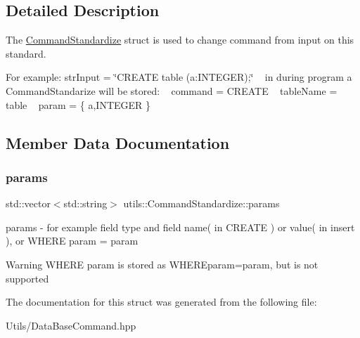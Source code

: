 \subsection{Detailed Description}
The \mbox{\hyperlink{structutils_1_1_command_standardize}{Command\+Standardize}} struct is used to change command from input on this standard. 

For example\+: str\+Input = \char`\"{}\+C\+R\+E\+A\+T\+E table (a\+:\+I\+N\+T\+E\+G\+E\+R);\char`\"{} ~\newline
 in during program a Command\+Standarize will be stored\+: ~\newline
 command = C\+R\+E\+A\+TE ~\newline
 table\+Name = table ~\newline
 param = \{ a,I\+N\+T\+E\+G\+ER \} 

\subsection{Member Data Documentation}
\mbox{\label{structutils_1_1_command_standardize_aac262dd521b08147d130def175b65c8d}} 
\subsubsection{\texorpdfstring{params}{params}}
{\footnotesize\ttfamily std\+::vector$<$std\+::string$>$ utils\+::\+Command\+Standardize\+::params}



params -\/ for example field type and field name( in C\+R\+E\+A\+T\+E ) or value( in insert ), or W\+H\+E\+RE param = param 

\begin{DoxyWarning}{Warning}
W\+H\+E\+RE param is stored as W\+H\+E\+R\+Eparam=param, but is not supported 
\end{DoxyWarning}


The documentation for this struct was generated from the following file\+:\begin{DoxyCompactItemize}
\item 
Utils/Data\+Base\+Command.\+hpp\end{DoxyCompactItemize}
